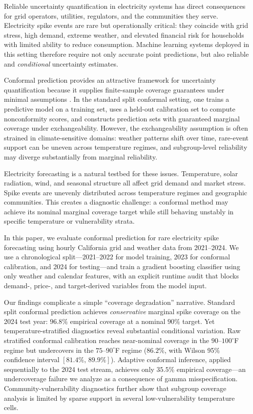 \documentclass{article}
\begin{document}
Reliable uncertainty quantification in electricity systems has direct
consequences for grid operators, utilities, regulators, and the communities
they serve. Electricity spike events are rare but operationally critical:
they coincide with grid stress, high demand, extreme weather, and elevated
financial risk for households with limited ability to reduce consumption.
Machine learning systems deployed in this setting therefore require not only
accurate point predictions, but also reliable and \emph{conditional}
uncertainty estimates.

Conformal prediction provides an attractive framework for uncertainty
quantification because it supplies finite-sample coverage guarantees under
minimal assumptions \citep{vovk2005,angelopoulos2023}. In the standard split
conformal setting, one trains a predictive model on a training set, uses a
held-out calibration set to compute nonconformity scores, and constructs
prediction sets with guaranteed marginal coverage under exchangeability.
However, the exchangeability assumption is often strained in climate-sensitive
domains: weather patterns shift over time, rare-event support can be uneven
across temperature regimes, and subgroup-level reliability may diverge
substantially from marginal reliability.

Electricity forecasting is a natural testbed for these issues. Temperature,
solar radiation, wind, and seasonal structure all affect grid demand and
market stress. Spike events are unevenly distributed across temperature
regimes and geographic communities. This creates a diagnostic challenge: a
conformal method may achieve its nominal marginal coverage target while still
behaving unstably in specific temperature or vulnerability strata.

In this paper, we evaluate conformal prediction for rare electricity spike
forecasting using hourly California grid and weather data from 2021--2024. We
use a chronological split---2021--2022 for model training, 2023 for conformal
calibration, and 2024 for testing---and train a gradient boosting classifier
using only weather and calendar features, with an explicit runtime audit that
blocks demand-, price-, and target-derived variables from the model input.

Our findings complicate a simple ``coverage degradation'' narrative. Standard
split conformal prediction achieves \emph{conservative} marginal spike
coverage on the 2024 test year: $96.8\%$ empirical coverage at a nominal
$90\%$ target. Yet temperature-stratified diagnostics reveal substantial
conditional variation. Raw stratified conformal calibration reaches near-nominal
coverage in the $90$--$100^{\circ}$F regime but undercovers in the $75$--$90^{\circ}$F
regime ($86.2\%$, with Wilson 95\% confidence interval $[81.4\%,\,89.9\%]$).
Adaptive conformal inference, applied sequentially to the 2024 test stream,
achieves only $35.5\%$ empirical coverage---an undercoverage failure we analyze
as a consequence of gamma misspecification. Community-vulnerability diagnostics
further show that subgroup coverage analysis is limited by sparse support in
several low-vulnerability temperature cells.
\end{document}
